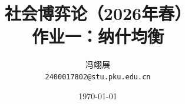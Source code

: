 \title{\textbf{社会博弈论（2026年春）} \\[0.5em]
    \Large 作业一：纳什均衡}
\author{冯翊展 \\ 
    \normalsize{\texttt{2400017802@stu.pku.edu.cn}}}
\date{\today}